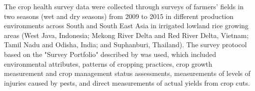 The crop health survey data were collected through surveys of farmers' fields in two seasons (wet and dry seasons) from 2009 to 2015 in different production environments across South and South East Asia in irrigated lowland rice growing areas (West Java, Indonesia; Mekong River Delta and Red River Delta, Vietnam; Tamil Nadu and Odisha, India; and Suphanburi, Thailand). The survey protocol based on the "Survey Portfolio" described by  was used, which included environmental attributes, patterns of cropping practices, crop growth measurement and crop management status assessments, measurements of levels of injuries caused by pests, and direct measurements of actual yields from crop cuts. 






